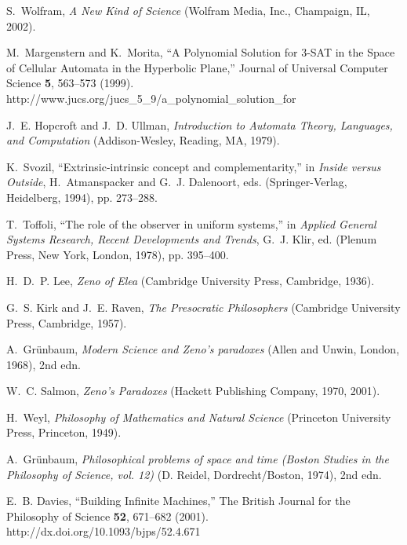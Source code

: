 \documentclass[pre,showpacs,showkeys,preprint]{revtex4}
\theoremstyle{definition}
\begin{document}
\begin{thebibliography}{10}
S.~Wolfram, {\em A New Kind of Science\/} (Wolfram Media, Inc., Champaign, IL,
  2002).

M.~Margenstern and K.~Morita, \enquote{A Polynomial Solution for 3-SAT in the
  Space of Cellular Automata in the Hyperbolic Plane,} Journal of Universal
  Computer Science {\bf 5}, 563--573 (1999).
\newline http://www.jucs.org/jucs\_5\_9/a\_polynomial\_solution\_for

J.~E. Hopcroft and J.~D. Ullman, {\em Introduction to Automata Theory,
  Languages, and Computation\/} (Addison-Wesley, Reading, MA, 1979).

K.~Svozil, \enquote{Extrinsic-intrinsic concept and complementarity,} in {\em
  Inside versus Outside\/}, H.~Atmanspacker and G.~J. Dalenoort, eds.
  (Springer-Verlag, Heidelberg, 1994), pp. 273--288.

T.~Toffoli, \enquote{The role of the observer in uniform systems,} in {\em
  Applied General Systems Research, Recent Developments and Trends\/}, G.~J.
  Klir, ed.  (Plenum Press, New York, London, 1978), pp. 395--400.

H.~D.~P. Lee, {\em Zeno of Elea\/} (Cambridge University Press, Cambridge,
  1936).

G.~S. Kirk and J.~E. Raven, {\em The Presocratic Philosophers\/} (Cambridge
  University Press, Cambridge, 1957).

A.~Gr{\"{u}}nbaum, {\em Modern Science and Zeno's paradoxes\/} (Allen and
  Unwin, London, 1968), 2nd edn.

W.~C. Salmon, {\em Zeno's Paradoxes\/} (Hackett Publishing Company, 1970,
  2001).

H.~Weyl, {\em Philosophy of Mathematics and Natural Science\/} (Princeton
  University Press, Princeton, 1949).

A.~Gr{\"{u}}nbaum, {\em Philosophical problems of space and time (Boston
  Studies in the Philosophy of Science, vol. 12)\/} (D. Reidel,
  Dordrecht/Boston, 1974), 2nd edn.

E.~B. Davies, \enquote{Building Infinite Machines,} The British Journal for the
  Philosophy of Science {\bf 52}, 671--682 (2001).
\newline http://dx.doi.org/10.1093/bjps/52.4.671


\end{thebibliography}
\end{document}
